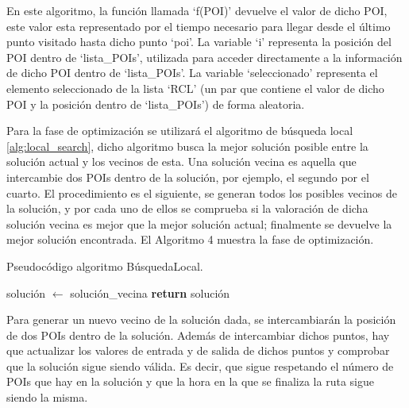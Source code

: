 En este algoritmo, la función llamada \enquote*{f(POI)} devuelve el valor de dicho POI, este valor esta representado por el tiempo necesario para llegar desde el último punto visitado hasta dicho punto \enquote*{poi}. La variable \enquote*{i} representa la posición del POI dentro de \enquote*{lista\_POIs}, utilizada para acceder directamente a la información de dicho POI dentro de \enquote*{lista\_POIs}. La variable \enquote*{seleccionado} representa el elemento seleccionado de la lista \enquote*{RCL} (un par que contiene el valor de dicho POI y la posición dentro de \enquote*{lista\_POIs}) de forma aleatoria.\newline

Para la fase de optimización se utilizará el algoritmo de búsqueda local \ref{alg:local_search}, dicho algoritmo busca la mejor solución posible entre la solución actual y los vecinos de esta. Una solución vecina es aquella que intercambie dos POIs dentro de la solución, por ejemplo, el segundo por el cuarto. El procedimiento es el siguiente, se generan todos los posibles vecinos de la solución, y por cada uno de ellos se comprueba si la valoración de dicha solución vecina es mejor que la mejor solución actual; finalmente se devuelve la mejor solución encontrada. El Algoritmo 4 muestra la fase de optimización.\newline

\begin{algorithm}[H]
	\caption{Pseudocódigo algoritmo BúsquedaLocal.}
	\label{alg:local_search}
	\begin{algorithmic}
			\State solución $\gets$ solución\_vecina
		\EndIf
		\EndFor
		\State \textbf{return} solución
		\EndFunction
	\end{algorithmic}
\end{algorithm}

\newpage
Para generar un nuevo vecino de la solución dada, se intercambiarán la posición de dos POIs dentro de la solución. Además de intercambiar dichos puntos, hay que actualizar los valores de entrada y de salida de dichos puntos y comprobar que la solución sigue siendo válida. Es decir, que sigue respetando el número de POIs que hay en la solución y que la hora en la que se finaliza la ruta sigue siendo la misma.



